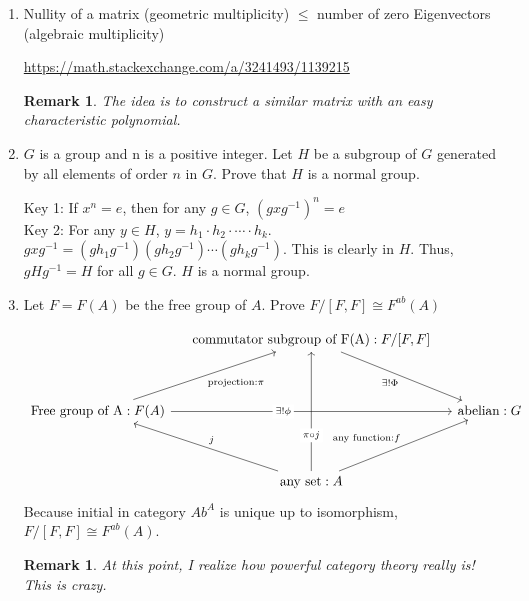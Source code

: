 \documentclass{article}
\newenvironment{solution}{
  \begin{tcolorbox}[mysolutionbox]
}{
  \end{tcolorbox}
}
\newtheorem{remark}[theorem]{Remark}
\begin{document}
\begin{enumerate}
    \item Nullity of a matrix (geometric multiplicity)  $\leq$ number of zero Eigenvectors (algebraic multiplicity)
    \begin{solution}
    \href{https://math.stackexchange.com/a/3241493/1139215}{https://math.stackexchange.com/a/3241493/1139215}
    \end{solution}
    \begin{remark}
        The idea is to construct a similar matrix with an easy characteristic  polynomial.
    \end{remark}
    \item $G$ is a group and n is a positive integer. Let $H$ be a subgroup of $G$ generated by all elements of order $n$ in $G$. Prove that $H$ is a normal group. 
    \begin{solution}
    Key 1: If $x^n=e$, then for any $g \in G$, $(gxg^{-1})^n=e$
    \\
    Key 2: For any $y \in H$, $y=h_1 \cdot h_2 \cdot \cdots \cdot h_k$. $gxg^{-1}=(gh_1g^{-1})(gh_2g^{-1}) \cdots (gh_kg^{-1})$. This is clearly in $H$. Thus, $gHg^{-1}=H$ for all $g \in G$. $H$ is a normal group. 
    \end{solution}
    \item Let $F=F(A)$ be the free group of $A$. Prove $F/[F,F]\cong F^{ab}(A)$
    \begin{solution}
        \[\begin{tikzcd}[column sep=tiny]
	&& {\text{commutator subgroup of F(A)}:F/[F,F]} \\
	\\
	{\text{Free group of A}: F(A)} &&&& \text{abelian}: G \\
	\\
	&& \text{any set}: A
	\arrow["{\exists! \Phi}"', from=1-3, to=3-5]
	\arrow["{\text{projection}:\pi}"', from=3-1, to=1-3]
	\arrow["{\exists !\phi}"{description, pos=0.4}, from=3-1, to=3-5]
	\arrow["{\pi \circ j}"{description, pos=0.3}, from=5-3, to=1-3]
	\arrow["j"', from=5-3, to=3-1]
	\arrow["{\text{any function}: f}", from=5-3, to=3-5]
\end{tikzcd}\]
    Because initial in category $Ab^{A}$ is unique up to isomorphism, $F/[F,F]\cong F^{ab}(A)$. 
    \end{solution}
    \begin{remark}
        At this point, I realize how powerful category theory really is! This is crazy. 
    \end{remark}
    \end{enumerate}
\end{document}
